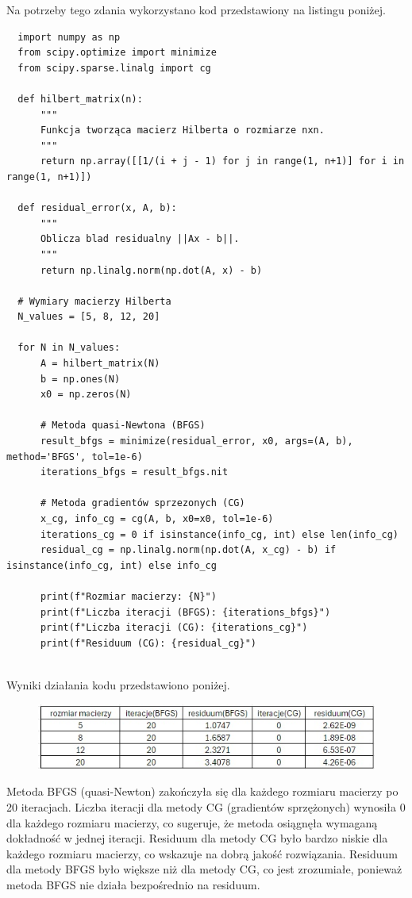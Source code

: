 \documentclass{article}
\begin{document}
Na potrzeby tego zdania wykorzystano kod przedstawiony na listingu poniżej.

\begin{lstlisting}
  import numpy as np
  from scipy.optimize import minimize
  from scipy.sparse.linalg import cg
  
  def hilbert_matrix(n):
      """
      Funkcja tworząca macierz Hilberta o rozmiarze nxn.
      """
      return np.array([[1/(i + j - 1) for j in range(1, n+1)] for i in range(1, n+1)])
  
  def residual_error(x, A, b):
      """
      Oblicza blad residualny ||Ax - b||.
      """
      return np.linalg.norm(np.dot(A, x) - b)
  
  # Wymiary macierzy Hilberta
  N_values = [5, 8, 12, 20]
  
  for N in N_values:
      A = hilbert_matrix(N)
      b = np.ones(N)
      x0 = np.zeros(N)
      
      # Metoda quasi-Newtona (BFGS)
      result_bfgs = minimize(residual_error, x0, args=(A, b), method='BFGS', tol=1e-6)
      iterations_bfgs = result_bfgs.nit
      
      # Metoda gradientów sprzezonych (CG)
      x_cg, info_cg = cg(A, b, x0=x0, tol=1e-6)
      iterations_cg = 0 if isinstance(info_cg, int) else len(info_cg)
      residual_cg = np.linalg.norm(np.dot(A, x_cg) - b) if isinstance(info_cg, int) else info_cg
      
      print(f"Rozmiar macierzy: {N}")
      print(f"Liczba iteracji (BFGS): {iterations_bfgs}")
      print(f"Liczba iteracji (CG): {iterations_cg}")
      print(f"Residuum (CG): {residual_cg}")
  
\end{lstlisting}

Wyniki działania kodu przedstawiono poniżej.

\begin{figure}[h]
 \includegraphics[scale=0.7]{zad7.jpg}
  \centering
\end{figure}

Metoda BFGS (quasi-Newton) zakończyła się dla każdego rozmiaru macierzy po 20 iteracjach.
Liczba iteracji dla metody CG (gradientów sprzężonych) wynosiła 0 dla każdego rozmiaru macierzy, co sugeruje, 
że metoda osiągnęła wymaganą dokładność w jednej iteracji.
Residuum dla metody CG było bardzo niskie dla każdego rozmiaru macierzy, 
co wskazuje na dobrą jakość rozwiązania.
Residuum dla metody BFGS było większe niż dla metody CG, co jest zrozumiałe, 
ponieważ metoda BFGS nie działa bezpośrednio na residuum.
\end{document}
